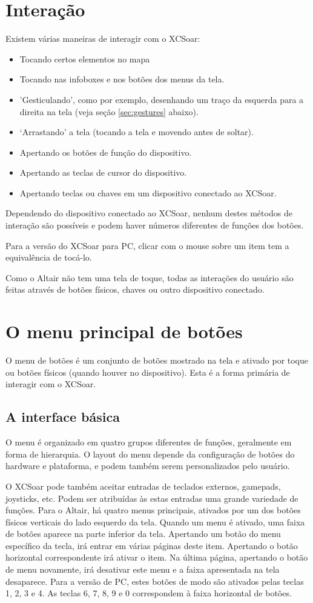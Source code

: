 \section{Interação}
Existem várias maneiras de interagir com o XCSoar:
\begin{itemize}
\item Tocando certos elementos no mapa
\item Tocando nas infoboxes e nos botões dos menus da tela.
\item 'Gesticulando', como por exemplo, desenhando um traço da esquerda para a direita na tela (veja seção  \ref{sec:gestures} abaixo).
\item ‘Arrastando’ a tela (tocando a tela e movendo antes de soltar).
\item Apertando os botões de função do dispositivo.
\item Apertando as teclas de cursor do dispositivo.
\item Apertando teclas ou chaves em um dispositivo conectado ao XCSoar.
\end{itemize}

Dependendo do dispositivo conectado ao XCSoar, nenhum destes métodos de interação são possíveis e podem haver números diferentes de funções dos botões.

Para a versão do XCSoar para PC, clicar com o mouse sobre um item tem a equivalência de tocá-lo.

Como o Altair não tem uma tela de toque, todas as interações do usuário são feitas através de botões físicos, chaves ou outro dispositivo conectado.  


\section{O menu principal de botões}
O menu de botões é um conjunto de botões mostrado na tela e ativado por toque ou botões físicos (quando houver no dispositivo).  Esta é a forma primária de interagir com o XCSoar.

\subsection*{A interface básica}
O menu é organizado em quatro grupos diferentes de funções, geralmente em forma de hierarquia.  O layout do menu depende da configuração de botões do hardware e plataforma, e podem também serem personalizados pelo usuário.

O XCSoar pode também aceitar entradas de teclados externos, gamepads, joysticks, etc.  Podem ser atribuídas às estas entradas uma grande variedade de funções.
Para o Altair, há quatro menus principais, ativados por um dos botões físicos verticais do lado esquerdo da tela.  Quando um menu é ativado, uma faixa de botões aparece na parte inferior da tela.  Apertando um botão do menu específico da tecla, irá entrar em várias páginas deste item.  Apertando o botão horizontal correspondente irá ativar o item.  Na última página, apertando o botão de menu novamente, irá desativar este menu e a faixa apresentada na tela desaparece.
Para a versão de PC, estes botões de modo são ativados pelas teclas 1, 2, 3 e 4.  As teclas 6, 7, 8, 9 e 0 correspondem à faixa horizontal de botões.


